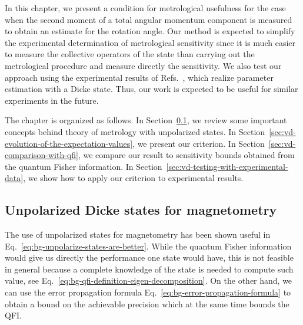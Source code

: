In this chapter, we present a condition for metrological usefulness for the case when the second moment of a total angular momentum component is measured to obtain an estimate for the rotation angle.
Our method is expected to simplify the experimental determination of metrological sensitivity since it is much easier to measure the collective operators of the state than carrying out the metrological procedure and measure directly the sensitivity.
We also test our approach using the experimental results of Refs.~\citep{VD48,VD50}, which realize parameter estimation with a Dicke state.
Thus, our work is expected to be useful for similar experiments in the future.

The chapter is organized as follows.
In Section~\ref{sec:vd-unpolarized-states-magnetometry}, we review some important concepts behind theory of metrology with unpolarized states.
In Section~\ref{sec:vd-evolution-of-the-expectation-values}, we present our criterion.
In Section~\ref{sec:vd-comparison-with-qfi}, we compare our result to sensitivity bounds obtained from the quantum Fisher information.
In Section~\ref{sec:vd-testing-with-experimental-data}, we show how to apply our criterion to experimental results.

\subsection{Unpolarized Dicke states for magnetometry}
\label{sec:vd-unpolarized-states-magnetometry}

The use of unpolarized states for magnetometry has been shown useful in Eq.~\eqref{eq:bg-unpolarize-states-are-better}.
While the quantum Fisher information would give us directly the performance one state would have, this is not feasible in general because a complete knowledge of the state is needed to compute such value, see Eq.~\eqref{eq:bg-qfi-definition-eigen-decomposition}.
On the other hand, we can use the error propagation formula Eq.~\eqref{eq:bg-error-propagation-formula} to obtain a bound on the achievable precision which at the same time bounds the QFI.

